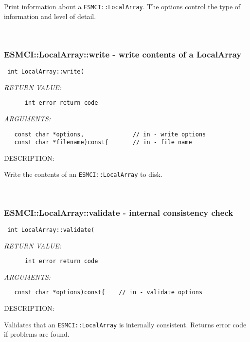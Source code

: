     Print information about a {\tt ESMCI::LocalArray}.  The options control
    the type of information and level of detail.
   
 
\mbox{}\hrulefill\
 
\subsubsection [ESMCI::LocalArray::write] {ESMCI::LocalArray::write - write contents of a LocalArray}


  
\begin{verbatim} int LocalArray::write(\end{verbatim}{\em RETURN VALUE:}
\begin{verbatim}      int error return code\end{verbatim}{\em ARGUMENTS:}
\begin{verbatim}   const char *options,              // in - write options
   const char *filename)const{       // in - file name\end{verbatim}
{\sf DESCRIPTION:\\ }


    Write the contents of an {\tt ESMCI::LocalArray} to disk.
   
 
\mbox{}\hrulefill\
 
\subsubsection [ESMCI::LocalArray::validate] {ESMCI::LocalArray::validate - internal consistency check}


  
\begin{verbatim} int LocalArray::validate(\end{verbatim}{\em RETURN VALUE:}
\begin{verbatim}      int error return code\end{verbatim}{\em ARGUMENTS:}
\begin{verbatim}   const char *options)const{    // in - validate options\end{verbatim}
{\sf DESCRIPTION:\\ }


    Validates that an {\tt ESMCI::LocalArray} is internally consistent.
    Returns error code if problems are found.
   
